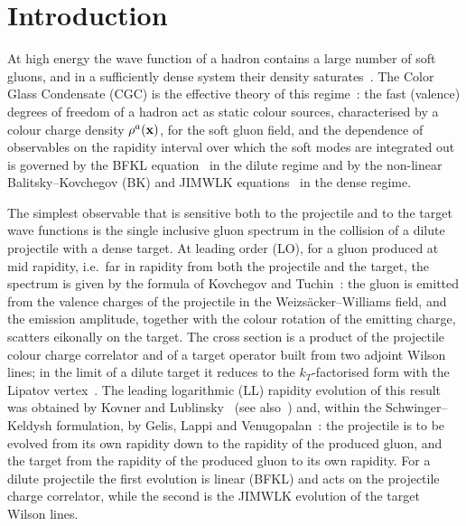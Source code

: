 \section{Introduction}\label{sec:intro}

At high energy the wave function of a hadron contains a large number of soft gluons, and in a sufficiently dense system their density saturates~\cite{Gribov:1983ivg,Mueller:1985wy}. The Color Glass Condensate (CGC) is the effective theory of this regime~\cite{McLerran:1993ni,McLerran:1993ka,Iancu:2003xm,Weigert:2005us,Gelis:2010nm,Kovchegov:2012mbw}: the fast (valence) degrees of freedom of a hadron act as static colour sources, characterised by a colour charge density $\rho^a(\mathbf{x})$, for the soft gluon field, and the dependence of observables on the rapidity interval over which the soft modes are integrated out is governed by the BFKL equation~\cite{Kuraev:1977fs,Balitsky:1978ic} in the dilute regime and by the non-linear Balitsky--Kovchegov (BK) and JIMWLK equations~\cite{Balitsky:1995ub,Kovchegov:1999yj,Kovchegov:1999ua,Jalilian-Marian:1997qno,Jalilian-Marian:1997jx,Jalilian-Marian:1997ubg,Kovner:2000pt,Weigert:2000gi,Iancu:2000hn,Iancu:2001ad,Ferreiro:2001qy} in the dense regime.

The simplest observable that is sensitive both to the projectile and to the target wave functions is the single inclusive gluon spectrum in the collision of a dilute projectile with a dense target. At leading order (LO), for a gluon produced at mid rapidity, i.e.\ far in rapidity from both the projectile and the target, the spectrum is given by the formula of Kovchegov and Tuchin~\cite{Kovchegov:2001sc,Kovchegov:1998bi}: the gluon is emitted from the valence charges of the projectile in the Weizs\"acker--Williams field, and the emission amplitude, together with the colour rotation of the emitting charge, scatters eikonally on the target. The cross section is a product of the projectile colour charge correlator and of a target operator built from two adjoint Wilson lines; in the limit of a dilute target it reduces to the $k_T$-factorised form with the Lipatov vertex~\cite{Gribov:1983ivg,Kharzeev:2003wz,Blaizot:2004wu}. The leading logarithmic (LL) rapidity evolution of this result was obtained by Kovner and Lublinsky~\cite{Kovner:2006wr} (see also~\cite{Kovner:2006ge}) and, within the Schwinger--Keldysh formulation, by Gelis, Lappi and Venugopalan~\cite{Gelis:2008rw}: the projectile is to be evolved from its own rapidity down to the rapidity of the produced gluon, and the target from the rapidity of the produced gluon to its own rapidity. For a dilute projectile the first evolution is linear (BFKL) and acts on the projectile charge correlator, while the second is the JIMWLK evolution of the target Wilson lines.

